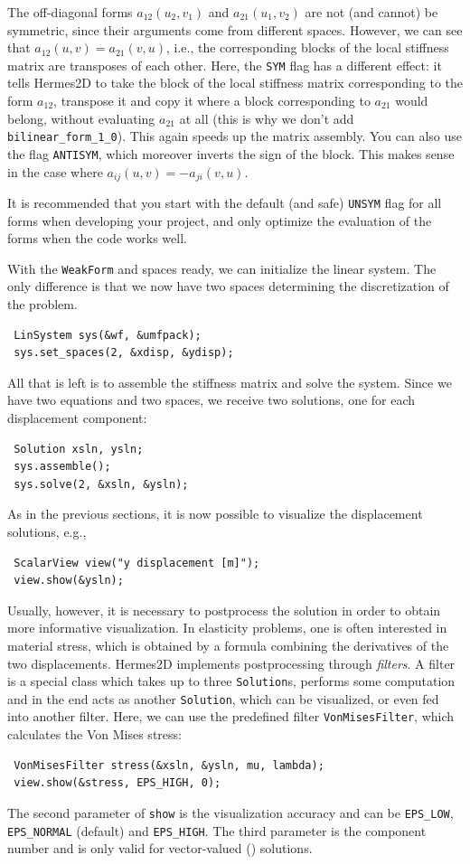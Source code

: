 The off-diagonal forms $a_{12}(u_2, v_1)$ and $a_{21}(u_1, v_2)$ are not
(and cannot) be symmetric, since their arguments come from different spaces.
However, we can see that $a_{12}(u, v) = a_{21}(v, u)$, i.e., the corresponding blocks
of the local stiffness matrix are transposes of each other. Here, the {\tt SYM} flag
has a different effect: it tells Hermes2D to take the block of the local stiffness
matrix corresponding to the form $a_{12}$, transpose it and copy it where a block
corresponding to $a_{21}$ would belong, without evaluating $a_{21}$ at all (this is why
we don't add {\tt bilinear\_form\_1\_0}). This again speeds up the matrix assembly.
You can also use the flag {\tt ANTISYM}, which moreover inverts the sign of the block.
This makes sense in the case where $a_{ij}(u, v) = -a_{ji}(v, u)$.

It is recommended that you start with the default (and safe) {\tt UNSYM} flag for all
forms when developing your project, and only optimize the evaluation of the forms when
the code works well.

With the {\tt WeakForm} and spaces ready, we can initialize the linear system.
The only difference is that we now have two spaces determining the discretization
of the problem.

\begin{lstlisting}
 LinSystem sys(&wf, &umfpack);
 sys.set_spaces(2, &xdisp, &ydisp);
\end{lstlisting}

All that is left is to assemble the stiffness matrix and solve the system.
Since we have two equations and two spaces, we receive two solutions, one for each
displacement component:
\begin{lstlisting}
 Solution xsln, ysln;
 sys.assemble();
 sys.solve(2, &xsln, &ysln);
\end{lstlisting}

\smallskip As in the previous sections, it is now possible to visualize the displacement
solutions, e.g.,
\begin{lstlisting}
 ScalarView view("y displacement [m]");
 view.show(&ysln);
\end{lstlisting}
Usually, however, it is necessary to postprocess the solution in order to obtain more
informative visualization. In elasticity problems, one is often interested in material
stress, which is obtained by a formula combining the derivatives of the two displacements.
Hermes2D implements postprocessing through \emph{filters}. A filter is a special class
which takes up to three \verb"Solution"s, performs some computation and in the end acts
as another \verb"Solution", which can be visualized, or even fed into another filter.
Here, we can use the predefined filter \verb"VonMisesFilter", which calculates the
Von Mises stress:
\begin{lstlisting}
 VonMisesFilter stress(&xsln, &ysln, mu, lambda);
 view.show(&stress, EPS_HIGH, 0);
\end{lstlisting}
The second parameter of \verb"show" is the visualization accuracy and can be
\verb"EPS_LOW", \verb"EPS_NORMAL" (default) and \verb"EPS_HIGH". The third parameter is
the component number and is only valid for vector-valued (\Hcurl) solutions.

